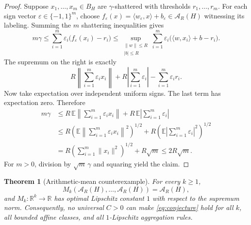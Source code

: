 \documentclass[11pt]{article}
\newtheorem{theorem}{Theorem}
\newcommand{\A}{\mathcal A}
\begin{document}
\begin{proof}
Suppose \(x_1,\ldots,x_m\in B_H\) are \(\gamma\)-shattered with thresholds
\(r_1,\ldots,r_m\).  For each sign vector
\(\varepsilon\in\{-1,1\}^m\), choose
\(f_\varepsilon(x)=\langle w_\varepsilon,x\rangle+b_\varepsilon\in\A_R(H)\)
witnessing its labeling.  Summing the \(m\) shattering inequalities gives
\[
 m\gamma
 \leq
 \sum_{i=1}^m\varepsilon_i
 \bigl(f_\varepsilon(x_i)-r_i\bigr)
 \leq
 \sup_{\substack{\|w\|\leq R\\|b|\leq R}}
 \sum_{i=1}^m\varepsilon_i
 \bigl(\langle w,x_i\rangle+b-r_i\bigr).
\]
The supremum on the right is exactly
\[
 R\left\|\sum_{i=1}^m\varepsilon_i x_i\right\|
 +R\left|\sum_{i=1}^m\varepsilon_i\right|
 -\sum_{i=1}^m\varepsilon_i r_i.
\]
Now take expectation over independent uniform signs.  The last term has
expectation zero.  Therefore
\begin{align*}
 m\gamma
 &\leq
 R\,\mathbb E\left\|\sum_{i=1}^m\varepsilon_i x_i\right\|
 +R\,\mathbb E\left|\sum_{i=1}^m\varepsilon_i\right|\\
 &\leq
 R\left(\mathbb E\left\|\sum_{i=1}^m\varepsilon_i x_i\right\|^2\right)^{1/2}
 +R\left(\mathbb E\left|\sum_{i=1}^m\varepsilon_i\right|^2\right)^{1/2}\\
 &=
 R\left(\sum_{i=1}^m\|x_i\|^2\right)^{1/2}+R\sqrt m
 \leq 2R\sqrt m.
\end{align*}
For \(m>0\), division by \(\sqrt m\,\gamma\) and squaring yield the claim.
\end{proof}

\begin{theorem}[Arithmetic-mean counterexample]
\label{thm:counterexample}
For every \(k\geq1\),
\[
 M_k(\A_R(H),\ldots,\A_R(H))=\A_R(H),
\]
and \(M_k:\mathbb R^k\to\mathbb R\) has optimal Lipschitz constant \(1\)
with respect to the supremum norm.  Consequently, no universal
\(C>0\) can make \eqref{eq:conjecture} hold for all \(k\), all bounded
affine classes, and all \(1\)-Lipschitz aggregation rules.
\end{theorem}
\end{document}
